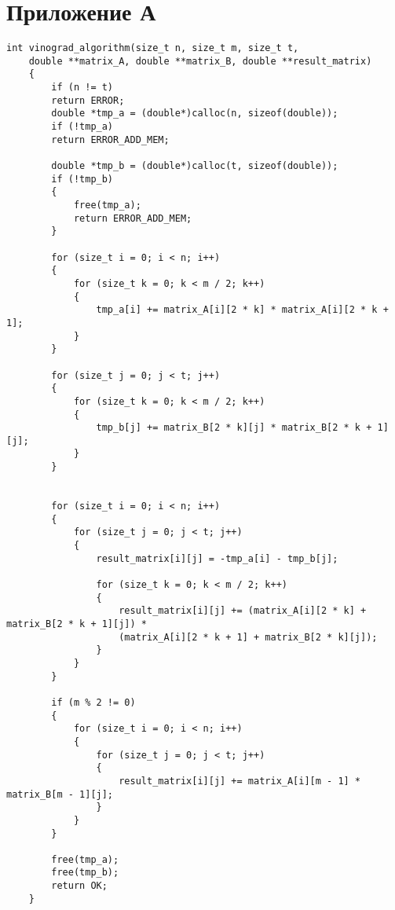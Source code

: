 \chapter*{Приложение А}

\renewcommand{\thelstlisting}{A.\arabic{lstlisting}}
\setcounter{lstlisting}{0}


\begin{lstlisting}[label=lst_vino_algo, caption=Реализация алгоритма Винограда]
	int vinograd_algorithm(size_t n, size_t m, size_t t,
	double **matrix_A, double **matrix_B, double **result_matrix)
	{
		if (n != t)
		return ERROR;
		double *tmp_a = (double*)calloc(n, sizeof(double));
		if (!tmp_a)
		return ERROR_ADD_MEM;
		
		double *tmp_b = (double*)calloc(t, sizeof(double));
		if (!tmp_b)
		{
			free(tmp_a);
			return ERROR_ADD_MEM;
		}
		
		for (size_t i = 0; i < n; i++)
		{
			for (size_t k = 0; k < m / 2; k++)
			{
				tmp_a[i] += matrix_A[i][2 * k] * matrix_A[i][2 * k + 1];
			}
		}
		
		for (size_t j = 0; j < t; j++)
		{
			for (size_t k = 0; k < m / 2; k++)
			{
				tmp_b[j] += matrix_B[2 * k][j] * matrix_B[2 * k + 1][j];
			}
		}
		
		
		for (size_t i = 0; i < n; i++)
		{
			for (size_t j = 0; j < t; j++)
			{
				result_matrix[i][j] = -tmp_a[i] - tmp_b[j];
				
				for (size_t k = 0; k < m / 2; k++)
				{
					result_matrix[i][j] += (matrix_A[i][2 * k] + matrix_B[2 * k + 1][j]) *
					(matrix_A[i][2 * k + 1] + matrix_B[2 * k][j]);
				}
			}
		}
		
		if (m % 2 != 0)
		{
			for (size_t i = 0; i < n; i++)
			{
				for (size_t j = 0; j < t; j++)
				{
					result_matrix[i][j] += matrix_A[i][m - 1] * matrix_B[m - 1][j];
				}
			}
		}
		
		free(tmp_a);
		free(tmp_b);
		return OK;
	}
\end{lstlisting}

